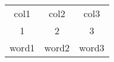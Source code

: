 \documentclass{article}
\begin{document}
\begin{center}
\begin{tabular}{ c c c }
col1 & col2 & col3\\
1 & 2 & 3\\
word1 & word2 & word3
\end{tabular}
\end{center}
\end{document}
